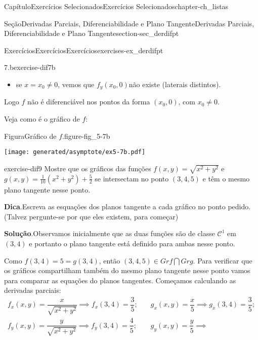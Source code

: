 \documentclass[oneside,10pt,]{book}
\newcommand{\blocktitlefont}{\relax}
\newcommand{\xreffont}{\relax}
\numberwithin{equation}{section}
\begin{document}
\begin{chapterptx}{Capítulo}{Exercícios Selecionados}{}{Exercícios Selecionados}{}{}{chapter-ch_listas}
\begin{sectionptx}{Seção}{Derivadas Parciais, Diferenciabilidade e Plano Tangente}{}{Derivadas Parciais, Diferenciabilidade e Plano Tangente}{}{}{section-sec_derdifpt}
\begin{exercises-subsection-numberless}{Exercícios}{Exercícios}{}{Exercícios}{}{}{exercises-ex_derdifpt}
\begin{divisionexercise}{7.b}{}{}{exercise-dif7b}
\begin{itemize}[label=\textbullet]
\begin{equation*}
=\lim\limits_{(h,k)\to(0,0)}
h\dfrac{|k|}{\sqrt{h^2+k^2}}=0, 
\end{equation*}
pois é produto de um fator que tende a zero por outro limitado (veja o \hyperref[corollary-cor_confronto]{Corolário~{\xreffont\ref{corollary-cor_confronto}}} e os exemplos em \hyperref[figure-vid_limitada]{Figura~{\xreffont\ref{figure-vid_limitada}}}).%
\item{}se \(x=x_0\neq0\), vemos que \(f_y(x_0,0)\)não existe (laterais distintos).%
\end{itemize}
%
\par
Logo \(f\) não é diferenciável nos pontos da forma \((x_0,0)\), com \(x_0\neq0\).%
\par
Veja como é o gráfico de \(f\): \begin{figureptx}{Figura}{Gráfico de \(f\).}{figure-fig_5-7b}{}%
\begin{image}{0.25}{0.5}{0.25}{}%
\texttt{[image: generated/asymptote/ex5-7b.pdf]}
\end{image}%
\tcblower
\end{figureptx}%
%
\end{divisionexercise}%
\begin{divisionexercise}{9}{}{}{exercise-dif9}%
Mostre que os gráficos das funções \(f(x,y)=\sqrt{x^2+y^2}\) e \(g(x,y)=\frac{1}{10}(x^2+y^2)+\frac{5}{2}\) se intersectam no ponto \((3,4,5)\) e têm o mesmo plano tangente nesse ponto.%
\par\smallskip%
\noindent\textbf{\blocktitlefont Dica}.\hypertarget{hint-dif9-b}{}\quad{}Escreva as esquações dos planos tangente a cada gráfico no ponto pedido. (Talvez pergunte-se por que eles existem, para começar)%
\par\smallskip%
\noindent\textbf{\blocktitlefont Solução}.\hypertarget{solution-dif9-c}{}\quad{}Observamos inicialmente que as duas funções são de classe \(\mathscr{C}^1\) em \((3,4)\) e portanto o plano tangente está definido para ambas nesse ponto.%
\par
Como \(f(3,4)=5=g(3,4)\), então \((3,4,5)\in Gr f\bigcap
Gr g\). Para verificar que os gráficos compartilham também do mesmo plano tangente nesse ponto vamos para comparar as equações do planos tangentes. Começamos calculando as derivadas parciais:%
\begin{align*}
f_x(x,y)=\dfrac{x}{\sqrt{x^2+y^2}}\implies
f_x(3,4)=\dfrac{3}{5};&\quad
g_x(x,y)=\dfrac{x}{5}\implies
g_x(3,4)=\dfrac{3}{5};\\
f_y(x,y)=\dfrac{y}{\sqrt{x^2+y^2}}\implies
f_y(3,4)=\dfrac{4}{5};&\quad g_y(x,y)=\dfrac{y}{5}\implies

\end{align*}
\end{divisionexercise}
\end{exercises-subsection-numberless}
\end{sectionptx}
\end{chapterptx}
\end{document}
